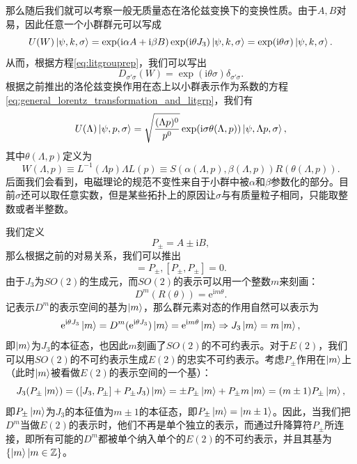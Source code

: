 那么随后我们就可以考察一般无质量态在洛伦兹变换下的变换性质。由于$ A,B$对易，因此任意一个小群群元可以写成
\begin{equation*}
	U( W)\ket{\psi ,k,\sigma } =\exp(\mathrm{i} \alpha A+\mathrm{i} \beta B)\exp(\mathrm{i} \theta J_{3})\ket{\psi ,k,\sigma } =\exp(\mathrm{i} \theta \sigma )\ket{\psi ,k,\sigma } .
\end{equation*}
从而，根据方程\ref{eq:litgrouprep}，我们可以写出
\begin{equation*}
	D_{\sigma '\sigma }( W) =\exp(\mathrm{i} \theta \sigma ) \delta _{\sigma '\sigma } .
\end{equation*}
根据之前推出的洛伦兹变换作用在态上以小群表示作为系数的方程\ref{eq:general_lorentz_transformation_and_litgrp}，我们有
\begin{equation}
	U( \Lambda )\ket{\psi ,p,\sigma } =\sqrt{\frac{( \Lambda p)^{0}}{p^{0}}}\exp(\mathrm{i} \sigma \theta ( \Lambda ,p))\ket{\psi ,\Lambda p,\sigma } ,
	\label{eq:lorentz_trans_on_massless_part}
\end{equation}
其中$ \theta ( \Lambda ,p)$定义为
\begin{equation*}
	W( \Lambda ,p) \equiv L^{-1}( \Lambda p) \Lambda L( p) \equiv S( \alpha ( \Lambda ,p) ,\beta ( \Lambda ,p)) R( \theta ( \Lambda ,p)) .
\end{equation*}
后面我们会看到，电磁理论的规范不变性来自于小群中被$ \alpha $和$ \beta $参数化的部分。目前$ \sigma $还可以取任意实数，但是某些拓扑上的原因让$ \sigma $与有质量粒子相同，只能取整数或者半整数。

我们定义
\begin{equation*}
	P_{\pm } =A\pm \mathrm{i} B,
\end{equation*}
那么根据之前的对易关系，我们可以推出
\begin{equation*}
	[ J_{3} ,P_{\pm }] =P_{\pm } ,[ P_{\pm } ,P_{\pm }] =0.
\end{equation*}
由于$ J_{3}$为$ SO( 2)$的生成元，而$ SO( 2)$的表示可以用一个整数$ m$来刻画：
\begin{equation*}
	D^{m}( R( \theta )) =\mathrm{e}^{\mathrm{i} m\theta } .
\end{equation*}
记表示$ D^{m}$的表示空间的基为$ \ket{m}$，那么群元素对态的作用自然可以表示为
\begin{equation*}
	\mathrm{e}^{\mathrm{i} \theta J_{3}}\ket{m} =D^{m} (\mathrm{e}^{\mathrm{i} \theta J_{3}} )\ket{m} =\mathrm{e}^{\mathrm{i} m\theta }\ket{m} \Rightarrow J_{3}\ket{m} =m\ket{m} ,
\end{equation*}
即$ \ket{m}$为$ J_{3}$的本征态，也因此$ m$刻画了$ SO( 2)$的不可约表示。对于$ E( 2)$，我们可以用$ SO( 2)$的不可约表示生成$ E( 2)$的忠实不可约表示。考虑$ P_{\pm }$作用在$ \ket{m}$上（此时$ \ket{m}$被看做$ E( 2)$的表示空间的一个基）：
\begin{equation*}
	J_{3} (P_{\pm }\ket{m} )=([ J_{3} ,P_{\pm }] +P_{\pm } J_{3} )\ket{m} =\pm P_{\pm }\ket{m} +P_{\pm } m\ket{m} =( m\pm 1) P_{\pm }\ket{m} ,
\end{equation*}
即$ P_{\pm }\ket{m}$为$ J_{3}$的本征值为$ m\pm 1$的本征态，即$ P_{\pm }\ket{m} =\ket{m\pm 1}$。因此，当我们把$ D^{m}$当做$ E( 2)$的表示时，他们不再是单个独立的表示，而通过升降算符$ P_{\pm }$所连接，即所有可能的$ D^{m}$都被单个纳入单个的$ E( 2)$的不可约表示，并且其基为$ \{\ket{m} |m\in \mathbb{Z} \}$。


